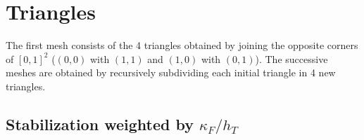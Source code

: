 \documentclass[10pt]{article}
\begin{document}
\section{Triangles}
The first mesh consists of the 4 triangles obtained by joining the opposite corners of $[0,1]^2$ ($(0,0)$ with $(1,1)$ and $(1,0)$ with $(0,1)$). The successive meshes are obtained by recursively subdividing each initial triangle in 4 new triangles.
\subsection{Stabilization weighted by $\kappa_F/h_T$}
  \begin{figure}[ht]
    \centering
      \scalebox{0.4}{}%
      \scalebox{0.4}{}%
      \scalebox{0.4}{}
      \scalebox{0.4}{}%
      \scalebox{0.4}{} %
      \scalebox{0.4}{}
  \end{figure}

  \begin{figure}[ht]
    \centering
      \scalebox{0.4}{}%
      \scalebox{0.4}{}%
      \scalebox{0.4}{}
      \scalebox{0.4}{}%
      \scalebox{0.4}{}%
      \scalebox{0.4}{}
      \scalebox{0.4}{}%
      \scalebox{0.4}{}%
      \scalebox{0.4}{}
  \end{figure}

  \begin{figure}[ht]
    \centering
      \scalebox{0.4}{}%
      \scalebox{0.4}{}%
      \scalebox{0.4}{}
      \scalebox{0.4}{}%
      \scalebox{0.4}{}%
      \scalebox{0.4}{}
      \scalebox{0.4}{}%
      \scalebox{0.4}{}%
      \scalebox{0.4}{}
  \end{figure}
\end{document}

